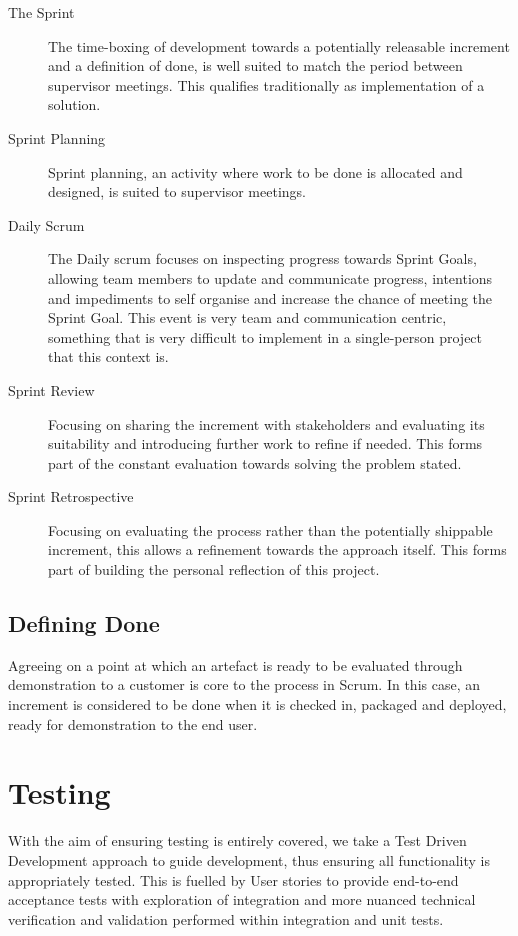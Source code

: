 \begin{description}
	\item[The Sprint] The time-boxing of development towards a potentially releasable increment and a definition of done, is well suited to match the period between supervisor meetings. This qualifies traditionally as implementation of a solution.
	
	\item[Sprint Planning] Sprint planning, an activity where work to be done is allocated and designed, is suited to supervisor meetings. 
	
	\item[Daily Scrum] The Daily scrum focuses on inspecting progress towards Sprint Goals, allowing team members to update and communicate progress, intentions and impediments to self organise and increase the chance of meeting the Sprint Goal. This event is very team and communication centric, something that is very difficult to implement in a single-person project that this context is.
	
	\item[Sprint Review] Focusing on sharing the increment with stakeholders and evaluating its suitability and introducing further work to refine if needed. This forms part of the constant evaluation towards solving the problem stated. 
	
	\item[Sprint Retrospective] Focusing on evaluating the process rather than the potentially shippable increment, this allows a refinement towards the approach itself. This forms part of building the personal reflection of this project.
	
\end{description}

\subsection{Defining Done}

Agreeing on a point at which an artefact is ready to be evaluated through demonstration to a customer is core to the process in Scrum. In this case, an increment is considered to be done when it is checked in, packaged and deployed, ready for demonstration to the end user. 

\newpage
\section{Testing}

With the aim of ensuring testing is entirely covered, we take a Test Driven Development approach to guide development, thus ensuring all functionality is appropriately tested. This is fuelled by User stories to provide end-to-end acceptance tests with exploration of integration and more nuanced technical verification and validation performed within integration and unit tests.
